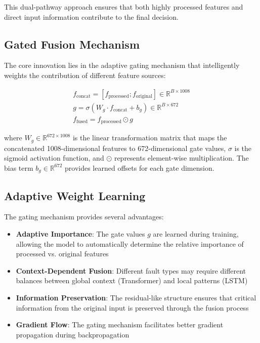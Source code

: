 This dual-pathway approach ensures that both highly processed features and direct input information contribute to the final decision.

\subsection{Gated Fusion Mechanism}
\label{subsec:gated_fusion}

The core innovation lies in the adaptive gating mechanism that intelligently weights the contribution of different feature sources:

\begin{align}
f_{\text{concat}} = [f_{\text{processed}}; f_{\text{original}}] \in \mathbb{R}^{B \times 1008} \\
g = \sigma(W_g \cdot f_{\text{concat}} + b_g) \in \mathbb{R}^{B \times 672} \\
f_{\text{fused}} = f_{\text{processed}} \odot g
\end{align}

where $W_g \in \mathbb{R}^{672 \times 1008}$ is the linear transformation matrix that maps the concatenated 1008-dimensional features to 672-dimensional gate values, $\sigma$ is the sigmoid activation function, and $\odot$ represents element-wise multiplication. The bias term $b_g \in \mathbb{R}^{672}$ provides learned offsets for each gate dimension.

\subsection{Adaptive Weight Learning}
\label{subsec:adaptive_weights}

The gating mechanism provides several advantages:

\begin{itemize}
    \item \textbf{Adaptive Importance}: The gate values $g$ are learned during training, allowing the model to automatically determine the relative importance of processed vs. original features
    \item \textbf{Context-Dependent Fusion}: Different fault types may require different balances between global context (Transformer) and local patterns (LSTM)
    \item \textbf{Information Preservation}: The residual-like structure ensures that critical information from the original input is preserved through the fusion process
    \item \textbf{Gradient Flow}: The gating mechanism facilitates better gradient propagation during backpropagation
\end{itemize}

